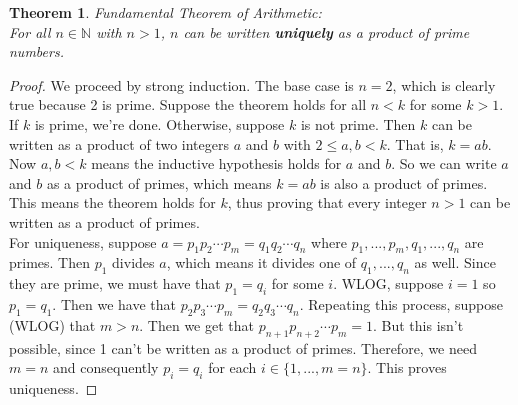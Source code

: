 \documentclass[12pt, a4paper, titlepage, twoside]{article}
\newcommand*{\N}{\mathbb{N}}
\newtheorem*{theorem*}{Theorem}
\begin{document}
	\begin{pf}
		\label{apA:fta}
		\begin{theorem*}
			Fundamental Theorem of Arithmetic:\\
			For all $n \in \N$ with $n > 1$, $n$ can be written \textbf{uniquely} as a product of prime numbers.
		\end{theorem*}

		\tcbline		
		
		\begin{proof}
			We proceed by strong induction. The base case is $n=2$, which is clearly true because 2 is prime.
			Suppose the theorem holds for all $n < k$ for some $k > 1$. If $k$ is prime, we're done. Otherwise, suppose $k$ is not
			prime. Then $k$ can be written as a product of two integers $a$ and $b$ with $2 \leqslant a, b < k$.
			That is, $k = ab$. Now $a,b < k$ means the inductive hypothesis holds for $a$ and $b$. So we can write
			$a$ and $b$ as a product of primes, which means $k = ab$ is also a product of primes. This means the theorem
			holds for $k$, thus proving that every integer $n > 1$ can be written as a product of primes.\\
			
			For uniqueness, suppose $a = p_1 p_2 \cdots p_m = q_1 q_2 \cdots q_n$ where $p_1, ..., p_m, q_1, ..., q_n$
			are primes. Then $p_1$ divides $a$, which means it divides one of $q_1, ..., q_n$ as well. Since they are prime, we must
			have that $p_1 = q_i$ for some $i$. WLOG, suppose $i = 1$ so $p_1 = q_1$. Then we have that
			$p_2 p_3 \cdots p_m = q_2 q_3 \cdots q_n$. Repeating this process, suppose (WLOG) that $m > n$. Then we get that
			$p_{n+1} p_{n+2} \cdots p_m = 1$. But this isn't possible, since 1 can't be written as a product of primes. Therefore, we
			need $m=n$ and consequently $p_i = q_i$ for each $i \in \{1, ..., m=n\}$. This proves uniqueness.
		\end{proof}
	\end{pf}
	
	\newpage
	
\end{document}

